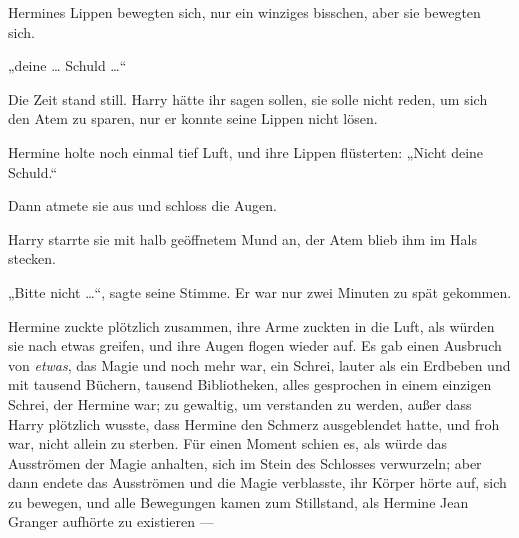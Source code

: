Hermines Lippen bewegten sich, nur ein winziges bisschen, aber sie bewegten sich.

„deine … Schuld …“

Die Zeit stand still. Harry hätte ihr sagen sollen, sie solle nicht reden, um sich den Atem zu sparen, nur er konnte seine Lippen nicht lösen.

Hermine holte noch einmal tief Luft, und ihre Lippen flüsterten:
„Nicht deine Schuld.“

Dann atmete sie aus und schloss die Augen.

Harry starrte sie mit halb geöffnetem Mund an, der Atem blieb ihm im Hals stecken.

„Bitte nicht …“, sagte seine Stimme. Er war nur zwei Minuten zu spät gekommen.

Hermine zuckte plötzlich zusammen, ihre Arme zuckten in die Luft, als würden sie nach etwas greifen, und ihre Augen flogen wieder auf. Es gab einen Ausbruch von \emph{etwas}, das Magie und noch mehr war, ein Schrei, lauter als ein Erdbeben und mit tausend Büchern, tausend Bibliotheken, alles gesprochen in einem einzigen Schrei, der Hermine war; zu gewaltig, um verstanden zu werden, außer dass Harry plötzlich wusste, dass Hermine den Schmerz ausgeblendet hatte, und froh war, nicht allein zu sterben. Für einen Moment schien es, als würde das Ausströmen der Magie anhalten, sich im Stein des Schlosses verwurzeln; aber dann endete das Ausströmen und die Magie verblasste, ihr Körper hörte auf, sich zu bewegen, und alle Bewegungen kamen zum Stillstand, als Hermine Jean Granger aufhörte zu existieren —

